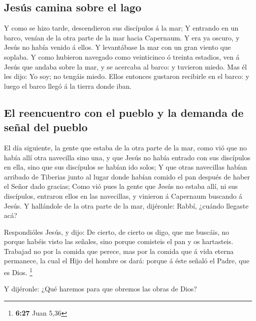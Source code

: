 \hypertarget{jesuxfas-camina-sobre-el-lago}{%
\subsection{Jesús camina sobre el
lago}\label{jesuxfas-camina-sobre-el-lago}}

 Y como se hizo tarde, descendieron sus discípulos á la
mar;  Y entrando en un barco, venían de la otra parte de la
mar hacia Capernaum. Y era ya oscuro, y Jesús no había venido á ellos.
 Y levantábase la mar con un gran viento que soplaba.
 Y como hubieron navegado como veinticinco ó treinta
estadios, ven á Jesús que andaba sobre la mar, y se acercaba al barco: y
tuvieron miedo.  Mas él les dijo: Yo soy; no tengáis miedo.
 Ellos entonces gustaron recibirle en el barco: y luego el
barco llegó á la tierra donde iban.

\hypertarget{el-reencuentro-con-el-pueblo-y-la-demanda-de-seuxf1al-del-pueblo}{%
\subsection{El reencuentro con el pueblo y la demanda de señal del
pueblo}\label{el-reencuentro-con-el-pueblo-y-la-demanda-de-seuxf1al-del-pueblo}}

 El día siguiente, la gente que estaba de la otra parte de
la mar, como vió que no había allí otra navecilla sino una, y que Jesús
no había entrado con sus discípulos en ella, sino que sus discípulos se
habían ido solos;  Y que otras navecillas habían arribado
de Tiberias junto al lugar donde habían comido el pan después de haber
el Señor dado gracias;  Como vió pues la gente que Jesús no
estaba allí, ni sus discípulos, entraron ellos en las navecillas, y
vinieron á Capernaum buscando á Jesús.  Y hallándole de la
otra parte de la mar, dijéronle: Rabbí, ¿cuándo llegaste acá?

 Respondióles Jesús, y dijo: De cierto, de cierto os digo,
que me buscáis, no porque habéis visto las señales, sino porque
comisteis el pan y os hartasteis.  Trabajad no por la
comida que perece, mas por la comida que á vida eterna permanece, la
cual el Hijo del hombre os dará: porque á éste señaló el Padre, que es
Dios. \footnote{\textbf{6:27} Juan 5,36}

 Y dijéronle: ¿Qué haremos para que obremos las obras de
Dios?

